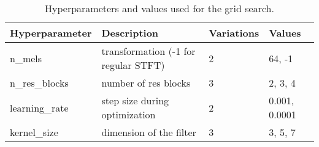 \begin{table}[H]
    \centering
    \caption{Hyperparameters and values used for the grid search.}
    \label{tab:hyperparameters}
    \begin{tabular}{llll}
    \toprule
    \textbf{Hyperparameter} & \textbf{Description}                  & \textbf{Variations}   & \textbf{Values} \\
    \midrule
    n\_mels                 & transformation (-1 for regular STFT)  & 2                     & 64, -1 \\
    n\_res\_blocks          & number of res blocks                  & 3                     & 2, 3, 4 \\
    learning\_rate          & step size during optimization         & 2                     & 0.001, 0.0001 \\
    kernel\_size            & dimension of the filter               & 3                     & 3, 5, 7 \\
    \bottomrule
\end{tabular}

\end{table}